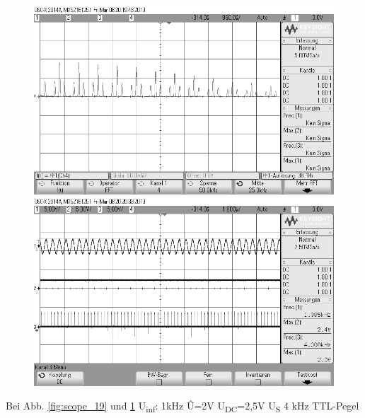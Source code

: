 \documentclass[12pt,a4paper]{scrartcl}
\begin{document}
     \begin{figure}[htbp]
    \begin{minipage}{0.48\textwidth}
     \centering
      \includegraphics[width=1\textwidth]{scope_19}
      \caption{}
      \label{fig:scope_19}
    \end{minipage}\hfill
    \begin{minipage}{0.48\textwidth}
     \centering
      \includegraphics[width=1\textwidth]{scope_20}
      \caption{}
      \label{fig:scope_20}
    \end{minipage}
  \end{figure} 
   Bei Abb. \ref{fig:scope_19} und \ref{fig:scope_20} U\textsubscript{inf}:  1kHz \^{U}=2V
        U\textsubscript{DC}=2,5V
        U\textsubscript{S} 4 kHz TTL-Pegel \\
\end{document}
